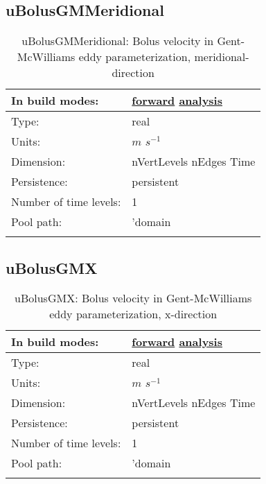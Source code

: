 \subsection[uBolusGMMeridional]{uBolusGMMeridional}
\label{subsec:var_sec_diagnostics_uBolusGMMeridional}
\begin{center}
\begin{longtable}{| p{2.0in} | p{4.0in} |}
        \hline 
        In build modes: & \hyperref[subsec:forward_var_tab_diagnostics]{forward} \hyperref[subsec:analysis_var_tab_diagnostics]{analysis} \\
        \hline 
        Type: & real \\
        \hline 
        Units: & $m$ $s^{-1}$ \\
        \hline 
        Dimension: & nVertLevels nEdges Time \\
        \hline 
        Persistence: & persistent \\
        \hline 
        Number of time levels: & 1 \\
        \hline 
            Pool path: & 'domain %
 \\
		 \hline 
    \caption{uBolusGMMeridional: Bolus velocity in Gent-McWilliams eddy parameterization, meridional-direction}
\end{longtable}
\end{center}
\subsection[uBolusGMX]{uBolusGMX}
\label{subsec:var_sec_diagnostics_uBolusGMX}
\begin{center}
\begin{longtable}{| p{2.0in} | p{4.0in} |}
        \hline 
        In build modes: & \hyperref[subsec:forward_var_tab_diagnostics]{forward} \hyperref[subsec:analysis_var_tab_diagnostics]{analysis} \\
        \hline 
        Type: & real \\
        \hline 
        Units: & $m$ $s^{-1}$ \\
        \hline 
        Dimension: & nVertLevels nEdges Time \\
        \hline 
        Persistence: & persistent \\
        \hline 
        Number of time levels: & 1 \\
        \hline 
            Pool path: & 'domain %
 \\
		 \hline 
    \caption{uBolusGMX: Bolus velocity in Gent-McWilliams eddy parameterization, x-direction}
\end{longtable}
\end{center}
